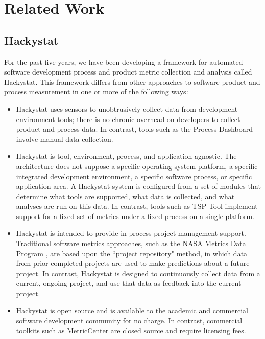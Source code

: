 \section{Related Work}

\subsection{Hackystat}

For the past five years, we have been developing a framework for
automated software development process and product metric collection and
analysis called Hackystat.  This framework differs from other approaches to
software product and process measurement in one or more of the following ways:

\begin{itemize}

\item Hackystat uses sensors to unobtrusively collect data from development
environment tools; there is no chronic overhead on developers to collect
product and process data.  In contrast, tools such as the Process Dashboard
\cite{PSPDashboard} involve manual data collection. 

\item Hackystat is tool, environment, process, and application agnostic.
The architecture does not suppose a specific operating system platform, a
specific integrated development environment, a specific software process,
or specific application area.  A Hackystat system is configured from a set
of modules that determine what tools are supported, what data is collected,
and what analyses are run on this data. In contrast, tools such as TSP Tool
\cite{TSPTool} implement support for a fixed set of metrics under a fixed
process on a single platform.

\item Hackystat is intended to provide in-process project management
support. Traditional software metrics approaches, such as 
the NASA Metrics Data Program \cite{MDPRepository},  are based upon the
``project repository" method, in which data from prior completed projects
are used to make predictions about a future
project. In contrast, Hackystat is designed to continuously collect data from a current,
ongoing project, and use that data as feedback into the current project.

\item Hackystat is open source and is available to the academic and
commercial software development community for no charge. In contrast,
commercial toolkits such as MetricCenter \cite{MetricCenter} are closed
source and require licensing fees.

\end{itemize}


